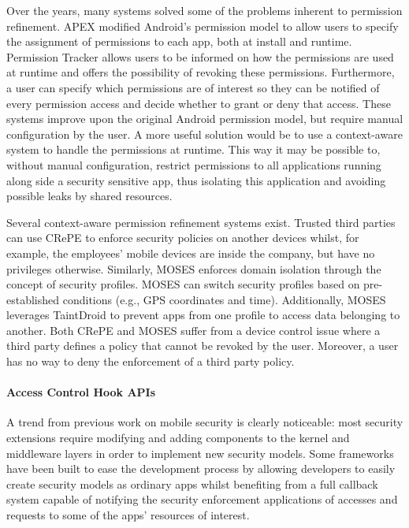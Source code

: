 Over the years, many systems solved some of the problems inherent to permission refinement. APEX \cite{nauman2010apex} modified Android's permission model to allow users to specify the assignment of permissions to each app, both at install and runtime. Permission Tracker \cite{kern2012permission} allows users to be informed on how the permissions are used at runtime and offers the possibility of revoking these permissions. Furthermore, a user can specify which permissions are of interest so they can be notified of every permission access and decide whether to grant or deny that access. These systems improve upon the original Android permission model, but require manual configuration by the user. A more useful solution would be to use a context-aware system to handle the permissions at runtime. This way it may be possible to, without manual configuration, restrict permissions to all applications running along side a security sensitive app, thus isolating this application and avoiding possible leaks by shared resources.

Several context-aware permission refinement systems exist. Trusted third parties can use CRePE \cite{conti2011crepe} to enforce security policies on another devices whilst, for example, the employees' mobile devices are inside the company, but have no privileges otherwise. Similarly, MOSES \cite{russello2012moses} enforces domain isolation through the concept of security profiles. MOSES can switch security profiles based on pre-established conditions (e.g., GPS coordinates and time).
Additionally, MOSES leverages TaintDroid \cite{enck2014taintdroid} to prevent apps from one profile to access data belonging to another. Both CRePE and MOSES suffer from a device control issue where a third party defines a policy that cannot be revoked by the user. Moreover, a user has no way to deny the enforcement of a third party policy. 

\paragraph{\textbf{Access Control Hook APIs}}

A trend from previous work on mobile security is clearly noticeable: most security extensions require modifying and adding components to the kernel and middleware layers in order to implement new security models. Some frameworks have been built to ease the development process by allowing developers to easily create security models as ordinary apps whilst benefiting from a full callback system capable of notifying the security enforcement applications of accesses and requests to some of the apps' resources of interest.

